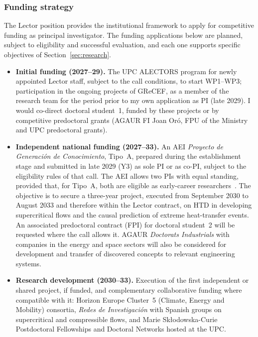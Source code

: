 \documentclass[11pt]{article}
\begin{document}
\subsubsection{Funding strategy}
The Lector position provides the institutional framework to
apply for competitive funding as principal investigator. 
The funding applications below are planned, subject to eligibility and successful evaluation, and each one supports specific objectives of Section~\ref{sec:research}.
\begin{itemize}
  \item \textbf{Initial funding (2027--29).} The UPC ALECTORS program for newly appointed Lector staff, subject to the call conditions, to start WP1--WP3; participation in the ongoing projects of GReCEF, as a member of the research team for the period prior to my own application as PI (late 2029). 
  I would co-direct doctoral student~1, funded by these projects or by competitive predoctoral grants (AGAUR FI Joan Or\'o, FPU of the Ministry and UPC predoctoral grants).
  
  \item \textbf{Independent national funding (2027--33).} An AEI \emph{Proyecto de Generaci\'on de Conocimiento}, Tipo~A, prepared during the establishment stage and submitted in late 2029 (Y3) as sole PI or as co-PI, subject to the eligibility rules of that call. 
  The AEI allows two PIs with equal standing, provided that, for Tipo~A, both are eligible as early-career
  researchers~\cite{AEI2025}. 
  The objective is to secure a three-year project, executed from September 2030 to August 2033 and therefore within the Lector contract, on HTD in developing supercritical flows and the causal prediction of extreme heat-transfer events. An associated predoctoral contract (FPI) for doctoral student~2 will be requested where the call allows it. 
  AGAUR \emph{Doctorats Industrials} with companies in the energy and space sectors will also be considered for development and transfer of discovered concepts to relevant engineering systems.
  
  \item \textbf{Research development (2030--33).} Execution of the first independent or shared project, if funded, and complementary collaborative funding where compatible with it: Horizon Europe Cluster~5 (Climate, Energy and Mobility) consortia, \emph{Redes de Investigaci\'on}   with Spanish groups on supercritical and compressible flows, and Marie Sk\l{}odowska-Curie Postdoctoral Fellowships and Doctoral Networks hosted at the UPC.
  

\end{itemize}
\end{document}
